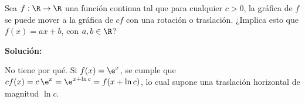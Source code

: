 \documentclass[../../main.tex]{subfiles}
\begin{document}
  \begin{shaded}
    Sea $f: \R \to \R$ una función continua tal que para cualquier $c > 0$, la gráfica de $f$ se puede mover a la gráfica de $c f$ con una rotación o traslación. ¿Implica esto que $f(x) = a x + b$, con $a, b \in \R$?
  \end{shaded}

  \textbf{Solución:}

  No tiene por qué. Si $f(x) = \e^x$, se cumple que $c f(x) = c \, \e^x = \e^{x + \ln{c}} = f(x + \ln{c})$, lo cual supone una traslación horizontal de magnitud $\ln{c}$.
\end{document}
